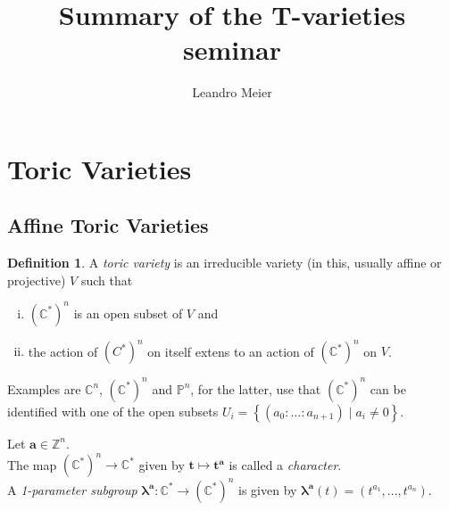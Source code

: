 \documentclass[a4paper]{article}
\title{Summary of the T-varieties seminar}
\author{Leandro Meier}
\date{}
\theoremstyle{definition}
\newtheorem{definition}[theorem]{Definition}
\begin{document}
\maketitle
\tableofcontents
\section{Toric Varieties}
\subsection{Affine Toric Varieties}
\begin{definition}
  A \emph{toric variety} is an irreducible variety (in this, usually affine or projective) $V$ such that 
  \begin{enumerate}[(i)]
    \item $\left( \mathbb{C}^{*} \right)^{n}$ is an open subset of $V$ and
    \item the action of $\left( C^{*} \right)^{n}$ on itself extens to an action of $\left( \mathbb{C}^{*} \right) ^{n}$ on $V$.
  \end{enumerate}
\end{definition}
  Examples are $\mathbb{C}^{n}$, $\left( \mathbb{C}^{*} \right) ^{n}$ and $\mathbb{P}^{n}$, for the latter, use that $\left( \mathbb{C}^{*} \right) ^{n}$ can be identified with one of the open subsets $U_{i} = \left\{\left( a_{0} \colon \dots \colon a_{n+1} \right) \mid a_{i} \neq 0\right\}$.

  Let $\boldsymbol{a} \in \mathbb{Z}^{n}$.\\
  The map $\left( \mathbb{C}^{*} \right) ^{n} \rightarrow \mathbb{C}^{*}$ given by $\boldsymbol{t} \mapsto \boldsymbol{t^{a}}$ is called a \emph{character}.\\
  A \emph{1-parameter subgroup} $\boldsymbol{\lambda^{a}} \colon \mathbb{C}^{*} \rightarrow \left( \mathbb{C}^{*} \right) ^{n}$ is given by $\boldsymbol{\lambda^{a}} \left( t \right) = \left( t^{a_{1}}, \dots, t^{a_{n}} \right) $.
\end{document}

